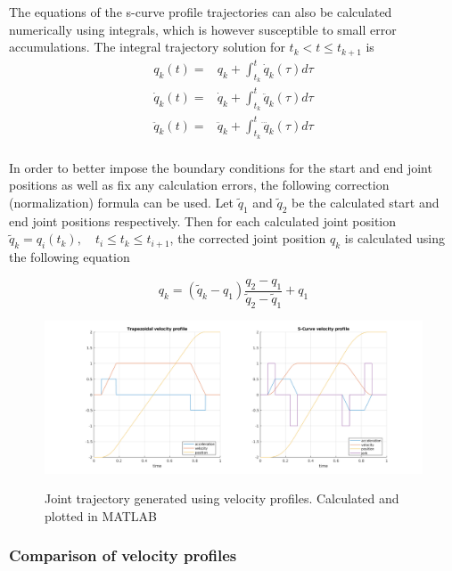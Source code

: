 The equations of the s-curve profile trajectories can also be calculated numerically using integrals, which is however susceptible to small error accumulations. The integral trajectory solution for 
$t_k < t \leq t_{k+1}$ is
\begin{equation}
\begin{aligned}
q_k(t) ={}& q_k + \int_{t_k}^t \dot{q}_k(τ)dτ \\
\dot{q}_k(t) ={}& \dot{q}_k + \int_{t_k}^t \ddot{q}_k(τ)dτ \\
\ddot{q}_k(t) ={}& \ddot{q}_k + \int_{t_k}^t \dddot{q}_k(τ)dτ \\
\end{aligned}
\end{equation}

In order to better impose the boundary conditions for the start and end joint positions as well as fix any calculation errors, the following correction (normalization) formula can be used. 
Let $\tilde{q}_1$ and $\tilde{q}_2$ be the calculated start and end joint positions respectively. Then for each calculated joint position $\tilde{q}_k = q_i(t_k), \quad t_i \leq t_k \leq t_{i+1}$, 
the corrected joint position $q_k$ is calculated using the following equation

\begin{equation}
q_k = (\tilde{q}_k - q_1) \frac{q_2 - q_1}{\tilde{q}_2 - \tilde{q}_1} + q_1
\end{equation}


\begin{center}
\begin{figure}[!htb]
\centering
\includegraphics[width=\textwidth]{images/vel-profiles.png}\\
\caption{Joint trajectory generated using velocity profiles. Calculated and plotted in MATLAB} 
\end{figure}
\end{center}


\subsubsection{Comparison of velocity profiles}

